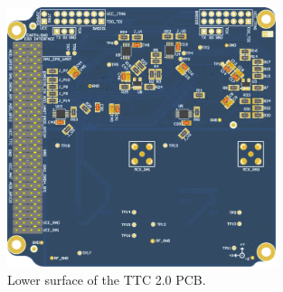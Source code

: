 \begin{figure}[!ht]
    \begin{center}
        \includegraphics[width=0.7\textwidth]{figures/ttc2_pcb_bottom.png}
        \caption{Lower surface of the TTC 2.0 PCB.}
        \label{fig:ttc2-pcb-bottom}
    \end{center}
\end{figure}
